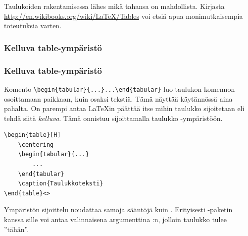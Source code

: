 \begin{fframe}
    Taulukoiden rakentamisessa lähes mikä tahansa on mahdollista. Kirjasta \url{http://en.wikibooks.org/wiki/LaTeX/Tables} voi etsiä apua monimutkaisempia toteutuksia varten.
\end{fframe}

%

\subsubsection{Kelluva table-ympäristö}
\begin{fframe}
    \frametitle{Kelluva table-ympäristö}
Komento \lstinline-\begin{tabular}{...}...\end{tabular}- luo taulukon komennon osoittamaan paikkaan, kuin osaksi tekstiä. Tämä näyttää käytännössä aina pahalta. 
    \pause
    \vaihto
    On parempi antaa \LaTeX in päättää itse mihin taulukko sijoitetaan eli tehdä siitä \emph{kelluva}. Tämä onnistuu sijoittamalla taulukko -ympäristöön.
    \begin{lstlisting}
\begin{table}[H]
    \centering
    \begin{tabular}{...}
        ...
    \end{tabular}
    \caption{Taulukkoteksti}
\end{table}<>
    \end{lstlisting}
    \pause
    Ympäristön  sijoittelu noudattaa samoja sääntöjä kuin . Erityisesti -paketin kanssa sille voi antaa valinnaisena argumenttina :n, jolloin taulukko tulee ''tähän''.
\end{fframe}

